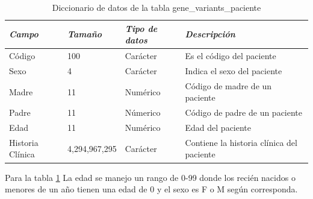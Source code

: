 \begin{table}[h!]
	\begin{tabular}{|l|l|l|p{6cm}|}
		\hline
		\textit{\textbf{Campo}} & \textit{\textbf{Tamaño}} & \textit{\textbf{Tipo de datos}} & \textit{\textbf{Descripción}}             \\ \hline
		Código                  & 100                      & Carácter                       & Es el código del paciente                 \\ \hline
		Sexo                    & 4                        & Carácter                       & Indica el sexo del paciente               \\ \hline
		Madre                   & 11                       & Numérico                       & Código de madre de un paciente            \\ \hline
		Padre                   & 11                       & Númerico                       & Código de padre de un paciente            \\ \hline
		Edad                    & 11                       & Numérico                       & Edad del paciente                         \\ \hline
		Historia Clínica        & 4,294,967,295            & Carácter                       & Contiene la historia clínica del paciente \\ \hline
	\end{tabular}
\caption{Diccionario de datos de la tabla gene\_variants\_paciente}
\label{tabla:datos}
\end{table}

Para la tabla \ref{tabla:datos} La edad se manejo un rango de 0-99 donde los recién nacidos o menores de un año tienen una edad de 0 y el sexo es F o M según corresponda.

